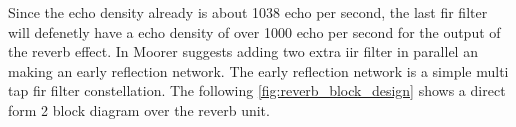     \startexplain
{}
    \stopexplain

Since the echo density already is about 1038 echo per second, the last \gls{fir} filter will defenetly have a echo density of over 1000 echo per second for the output of the \gls{reverb} effect. In \citep{DAFX} Moorer suggests adding two extra \gls{iir} filter in parallel an making an early reflection network. The early reflection network is a simple multi tap \gls{fir} filter constellation. The following \autoref{fig:reverb_block_design} shows a direct form 2 block diagram over the \gls{reverb} unit.

